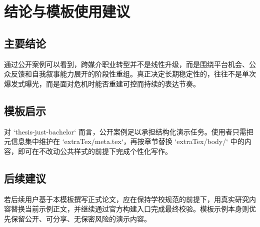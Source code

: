 \chapter{结论与模板使用建议}

\section{主要结论}

通过公开案例可以看到，跨媒介职业转型并不是线性升级，而是围绕平台机会、公众反馈和自我叙事能力展开的阶段性重组。真正决定长期稳定性的，往往不是单次爆发式曝光，而是面对危机时能否重建可控而持续的表达节奏。

\section{模板启示}

对 `thesis-just-bachelor` 而言，公开案例足以承担结构化演示任务。使用者只需把元信息集中维护在 `extraTex/meta.tex`，再按章节替换 `extraTex/body/` 中的内容，即可在不改动公共样式的前提下完成个性化写作。

\section{后续建议}

若后续用户基于本模板撰写正式论文，应在保持学校规范的前提下，用真实研究内容替换当前示例正文，并继续通过官方构建入口完成最终校验。模板示例本身则优先保留公开、可分享、无保密风险的演示内容。
